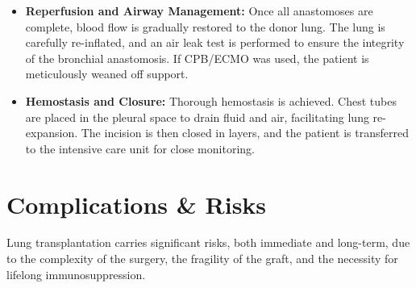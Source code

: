 \begin{itemize}
\begin{enumerate}
      \item \textbf{Pulmonary Arterial Anastomosis:} The donor pulmonary artery is connected to the recipient's pulmonary artery, typically end-to-end.
      \item \textbf{Pulmonary Venous Anastomosis:} The donor pulmonary veins, usually as a cuff of left atrium, are anastomosed to the recipient's left atrial cuff.
    \end{enumerate}
  \item \textbf{Reperfusion and Airway Management:} Once all anastomoses are complete, blood flow is gradually restored to the donor lung. The lung is carefully re-inflated, and an air leak test is performed to ensure the integrity of the bronchial anastomosis. If CPB/ECMO was used, the patient is meticulously weaned off support.
  \item \textbf{Hemostasis and Closure:} Thorough hemostasis is achieved. Chest tubes are placed in the pleural space to drain fluid and air, facilitating lung re-expansion. The incision is then closed in layers, and the patient is transferred to the intensive care unit for close monitoring.
\end{itemize}

\section*{Complications \& Risks}
Lung transplantation carries significant risks, both immediate and long-term, due to the complexity of the surgery, the fragility of the graft, and the necessity for lifelong immunosuppression.

